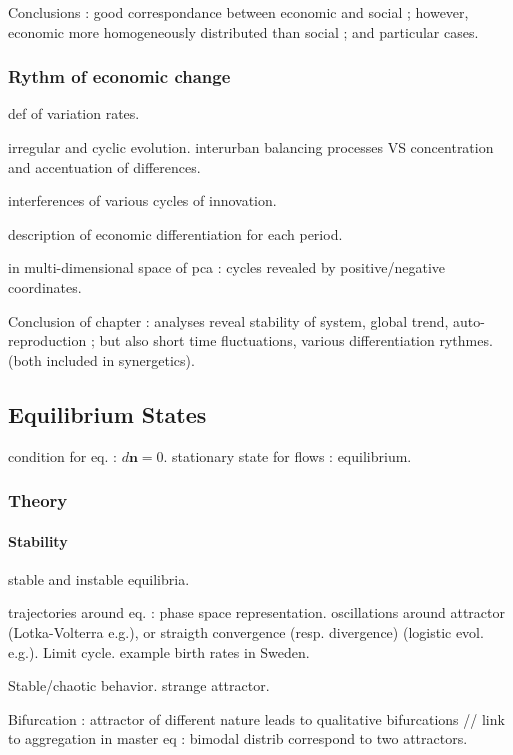 Conclusions : good correspondance between economic and social ; however, economic more homogeneously distributed than social ; and particular cases.

\subsubsection{Rythm of economic change}

def of variation rates.

irregular and cyclic evolution. interurban balancing processes VS concentration and accentuation of differences.

interferences of various cycles of innovation.

description of economic differentiation for each period.

in multi-dimensional space of pca : cycles revealed by positive/negative coordinates.

Conclusion of chapter : analyses reveal stability of system, global trend, auto-reproduction ; but also short time fluctuations, various differentiation rythmes. (both included in synergetics).



\subsection{Equilibrium States}


condition for eq. : $d\mathbf{n} = 0$. stationary state for flows : equilibrium.

\subsubsection{Theory}

\paragraph{Stability}

stable and instable equilibria.

trajectories around eq. : phase space representation. oscillations around attractor (Lotka-Volterra e.g.), or straigth convergence (resp. divergence) (logistic evol. e.g.). Limit cycle. example birth rates in Sweden.

Stable/chaotic behavior. strange attractor.

Bifurcation : attractor of different nature leads to qualitative bifurcations // link to aggregation in master eq : bimodal distrib correspond to two attractors.

